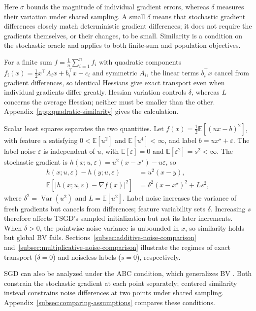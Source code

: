 Here $\sigma$ bounds the magnitude of individual gradient errors, whereas
$\delta$ measures their variation under shared sampling. A small $\delta$
means that stochastic gradient differences closely match deterministic
gradient differences; it does not require the gradients themselves, or
their changes, to be small. Similarity is a condition on the stochastic
oracle and applies to both finite-sum and population objectives.

For a finite sum $f=\frac1n\sum_{i=1}^n f_i$ with quadratic components
$f_i(x)=\tfrac12x^\top A_i x+b_i^\top x+c_i$ and symmetric $A_i$, the linear terms
$b_i^\top x$ cancel from gradient differences, so identical Hessians
give exact transport even when individual gradients differ greatly.
Hessian variation controls $\delta$, whereas $L$ concerns the average
Hessian; neither must be smaller than the other.
Appendix~\ref{app:quadratic-similarity} gives the calculation.

Scalar least squares separates the two quantities. Let
$f(x)=\tfrac12\mathbb E[(ux-b)^2]$, with feature $u$ satisfying
$0<\mathbb E[u^2]$ and $\mathbb E[u^4]<\infty$, and label
$b=ux^\star+\varepsilon$. The label noise $\varepsilon$ is independent
of $u$, with $\mathbb E[\varepsilon]=0$ and
$\mathbb E[\varepsilon^2]=s^2<\infty$. The stochastic gradient is
$h(x;u,\varepsilon)=u^2(x-x^\star)-u\varepsilon$, so
\begin{equation}
\label{eq:least-squares-similarity}
\begin{aligned}
h(x;u,\varepsilon)-h(y;u,\varepsilon)&=u^2(x-y),\\
\mathbb E[|h(x;u,\varepsilon)-\nabla f(x)|^2]
&=\delta^2(x-x^\star)^2+Ls^2,
\end{aligned}
\end{equation}
where $\delta^2=\operatorname{Var}(u^2)$ and $L=\mathbb E[u^2]$.
Label noise increases the variance of fresh gradients but cancels from
differences; feature variability sets $\delta$. Increasing $s$ therefore
affects TSGD's sampled initialization but not its later increments.
When $\delta>0$, the pointwise noise variance is unbounded in $x$,
so similarity holds but global BV fails.
Sections~\ref{subsec:additive-noise-comparison}
and~\ref{subsec:multiplicative-noise-comparison} illustrate the regimes
of exact transport ($\delta=0$) and noiseless labels ($s=0$), respectively.

SGD can also be analyzed under the ABC condition, which generalizes BV
\citep{khaled2023better}. Both constrain the stochastic gradient at
each point separately; centered similarity instead constrains noise
differences at two points under shared sampling.
Appendix~\ref{subsec:comparing-assumptions} compares these conditions.

